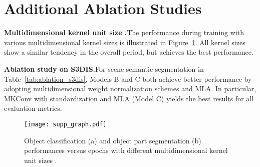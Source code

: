 \documentclass[preprint,12pt]{elsarticle}
\begin{document}
\section{Additional Ablation Studies}
\label{sec:ab}
\noindent\textbf{Multidimensional kernel unit size .}\hspace{0.3cm}The performance during training with various multidimensional kernel sizes is illustrated in Figure~\ref{fig:v_graph}. All kernel sizes show a similar tendency in the overall period, but  achieves the best performance.

\medskip
\noindent\textbf{Ablation study on S3DIS.}\hspace{0.3cm}For scene semantic segmentation in Table~\ref{tab:ablation_s3dis}, Models B and C both achieve better performance by adopting multidimensional weight normalization schemes and MLA. In particular, MKConv with standardization and MLA (Model C) yields the best results for all evaluation metrics.

\begin{figure}[t]
\centering
\texttt{[image: supp\_graph.pdf]}
\vspace{-0.3cm}
\caption{Object classification (a) and object part segmentation (b) performances versus epochs with different multidimensional kernel unit sizes .}
\label{fig:v_graph}
\end{figure}
\end{document}
